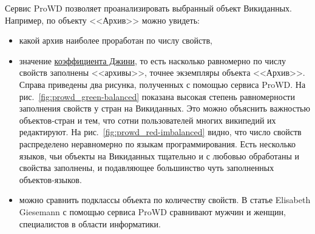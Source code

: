 Сервис ProWD позволяет проанализировать выбранный объект Викиданных. 
Например, по объекту <<Архив>> можно увидеть: 
\begin{itemize}
    \item какой архив наиболее проработан по числу свойств,

    \item значение \href{https://w.wiki/gg7}{коэффициента Джини}, то есть насколько равномерно по числу свойств заполнены <<архивы>>, точнее экземпляры объекта <<Архив>>. Справа приведены два рисунка, 
        полученных с помощью сервиса ProWD. 
        На рис.~\ref{fig:prowd_green-balanced} показана высокая степень 
        равномерности заполнения свойств у стран на Викиданных. 
        Это можно объяснить важностью объектов-стран и тем, что 
        сотни пользователей многих википедий их редактируют.
        На рис.~\ref{fig:prowd_red-imbalanced} видно, что число свойств 
        распределено неравномерно по языкам программирования. Есть несколько 
        языков, чьи объекты на Викиданных тщательно и с любовью обработаны и свойства заполнены, 
        и подавляющее большинство чуть заполненных объектов-языков.

    \item можно сравнить подклассы объекта по количеству свойств. В статье Elisabeth Giesemann\cite{Giesemann2020}
        с помощью сервиса ProWD сравнивают мужчин и женщин, специалистов в области информатики.
\end{itemize}






